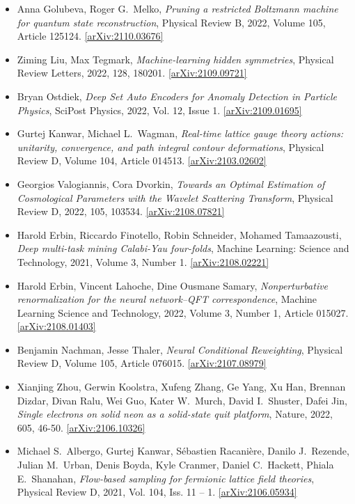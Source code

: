 \begin{itemize}
\item Anna Golubeva, Roger G.\  Melko, \textit{Pruning a restricted Boltzmann machine for quantum state reconstruction}, Physical Review B, 2022, Volume 105, Article 125124. \href{https://arxiv.org/abs/2110.03676}{[arXiv:2110.03676]} 
\item Ziming Liu, Max Tegmark, \textit{Machine-learning hidden symmetries}, Physical Review Letters, 2022, 128, 180201. \href{https://arxiv.org/abs/2109.09721}{[arXiv:2109.09721]} 
\item Bryan Ostdiek, \textit{Deep Set Auto Encoders for Anomaly Detection in Particle Physics}, SciPost Physics, 2022, Vol. 12, Issue 1. \href{https://arxiv.org/abs/2109.01695}{[arXiv:2109.01695]} 
\item Gurtej Kanwar, Michael L.\  Wagman, \textit{Real-time lattice gauge theory actions: unitarity, convergence, and path integral contour deformations}, Physical Review D, Volume 104, Article 014513. \href{https://arxiv.org/abs/2103.02602}{[arXiv:2103.02602]} 
\item Georgios Valogiannis, Cora Dvorkin, \textit{Towards an Optimal Estimation of Cosmological Parameters with the Wavelet Scattering Transform}, Physical Review D, 2022, 105, 103534. \href{https://arxiv.org/abs/2108.07821}{[arXiv:2108.07821]} 
\item Harold Erbin, Riccardo Finotello, Robin Schneider, Mohamed Tamaazousti, \textit{Deep multi-task mining Calabi-Yau four-folds}, Machine Learning: Science and Technology, 2021, Volume 3, Number 1. \href{https://arxiv.org/abs/2108.02221}{[arXiv:2108.02221]} 
\item Harold Erbin, Vincent Lahoche, Dine Ousmane Samary, \textit{Nonperturbative renormalization for the neural network--QFT correspondence}, Machine Learning Science and Technology, 2022, Volume 3, Number 1, Article 015027. \href{https://arxiv.org/abs/2108.01403}{[arXiv:2108.01403]} 
\item Benjamin Nachman, Jesse Thaler, \textit{Neural Conditional Reweighting}, Physical Review D, Volume 105, Article 076015. \href{https://arxiv.org/abs/2107.08979}{[arXiv:2107.08979]} 
\item Xianjing Zhou, Gerwin Koolstra, Xufeng Zhang, Ge Yang, Xu Han, Brennan Dizdar, Divan Ralu, Wei Guo, Kater W.\  Murch, David I.\  Shuster, Dafei Jin, \textit{Single electrons on solid neon as a solid-state quit platform}, Nature, 2022, 605, 46-50. \href{https://arxiv.org/abs/2106.10326}{[arXiv:2106.10326]} 
\item Michael S.\  Albergo, Gurtej Kanwar, Sébastien Racanière, Danilo J.\  Rezende, Julian M.\  Urban, Denis Boyda, Kyle Cranmer, Daniel C.\  Hackett, Phiala E.\  Shanahan, \textit{Flow-based sampling for fermionic lattice field theories}, Physical Review D, 2021, Vol. 104, Iss. 11 -- 1. \href{https://arxiv.org/abs/2106.05934}{[arXiv:2106.05934]} 

\end{itemize}
